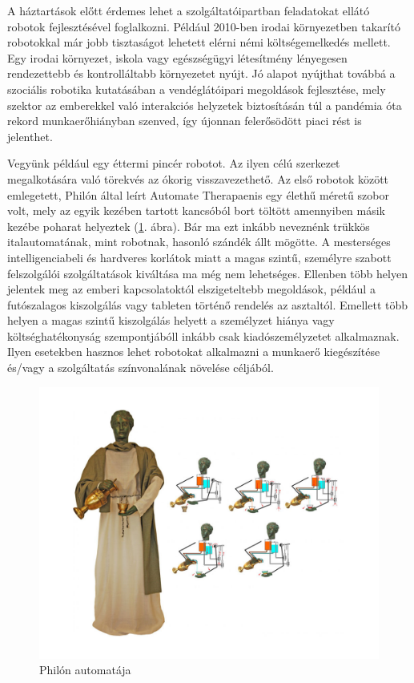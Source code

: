 A háztartások előtt érdemes lehet a szolgáltatóipartban feladatokat ellátó robotok fejlesztésével foglalkozni. Például 2010-ben irodai környezetben takarító robotokkal már jobb tisztaságot lehetett elérni némi költségemelkedés mellett. Egy irodai környezet, iskola vagy egészségügyi létesítmény lényegesen rendezettebb és kontrolláltabb környezetet nyújt. Jó alapot nyújthat továbbá a szociális robotika kutatásában a vendéglátóipari megoldások fejlesztése, mely szektor az emberekkel való interakciós helyzetek biztosításán túl a pandémia óta rekord munkaerőhiányban szenved, így újonnan felerősödött piaci rést is jelenthet.

Vegyünk például egy éttermi pincér robotot. Az ilyen célú szerkezet megalkotására való törekvés az ókorig visszavezethető. Az első robotok között emlegetett, Philón által leírt Automate Therapaenis egy élethű méretű szobor volt, mely az egyik kezében tartott kancsóból bort töltött amennyiben másik kezébe poharat helyeztek (\ref{fig:automaid_philon}. ábra). Bár ma ezt inkább neveznénk trükkös italautomatának, mint robotnak, hasonló szándék állt mögötte. A mesterséges intelligenciabeli és hardveres korlátok miatt a magas szintű, személyre szabott felszolgálói szolgáltatások kiváltása ma még nem lehetséges.
Ellenben több helyen jelentek meg az emberi kapcsolatoktól elszigeteltebb megoldások, például a futószalagos kiszolgálás vagy tableten történő rendelés az asztaltól. Emellett több helyen a magas szintű kiszolgálás helyett a személyzet hiánya vagy költséghatékonyság szempontjábóll inkább csak kiadószemélyzetet alkalmaznak. Ilyen esetekben hasznos lehet robotokat alkalmazni a munkaerő kiegészítése és/vagy a szolgáltatás színvonalának növelése céljából.

\begin{figure}[h]
    \centering
    \includegraphics[width=\linewidth]{figures/automaid_philon.jpg}
    \caption{Philón automatája}
    \label{fig:automaid_philon}
\end{figure}

